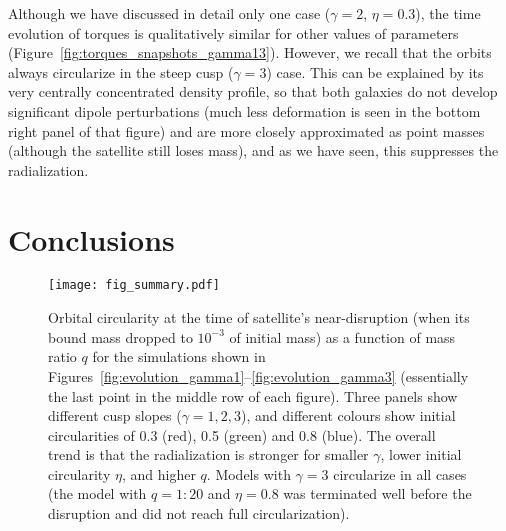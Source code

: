 \documentclass[twocolumn]{aastex63}
\begin{document}
Although we have discussed in detail only one case ($\gamma=2$, $\eta=0.3$), the time evolution of torques is qualitatively similar for other values of parameters (Figure~\ref{fig:torques_snapshots_gamma13}). However, we recall that the orbits always circularize in the steep cusp ($\gamma=3$) case. This can be explained by its very centrally concentrated density profile, so that both galaxies do not develop significant dipole perturbations (much less deformation is seen in the bottom right panel of that figure) and are more closely approximated as point masses (although the satellite still loses mass), and as we have seen, this suppresses the radialization.


\section{Conclusions}   \label{sec:conclusion}

\begin{figure}
\texttt{[image: fig\_summary.pdf]}
\caption{Orbital circularity at the time of satellite's near-disruption (when its bound mass dropped to $10^{-3}$ of initial mass) as a function of mass ratio $q$ for the simulations shown in Figures~\ref{fig:evolution_gamma1}--\ref{fig:evolution_gamma3} (essentially the last point in the middle row of each figure). Three panels show different cusp slopes ($\gamma=1,2,3$), and different colours show initial circularities of 0.3 (red), 0.5 (green) and 0.8 (blue). The overall trend is that the radialization is stronger for smaller $\gamma$, lower initial circularity $\eta$, and higher $q$. Models with $\gamma=3$ circularize in all cases (the model with $q=1:20$ and $\eta=0.8$ was terminated well before the disruption and did not reach full circularization).
}  \label{fig:summary}
\end{figure}
\end{document}
